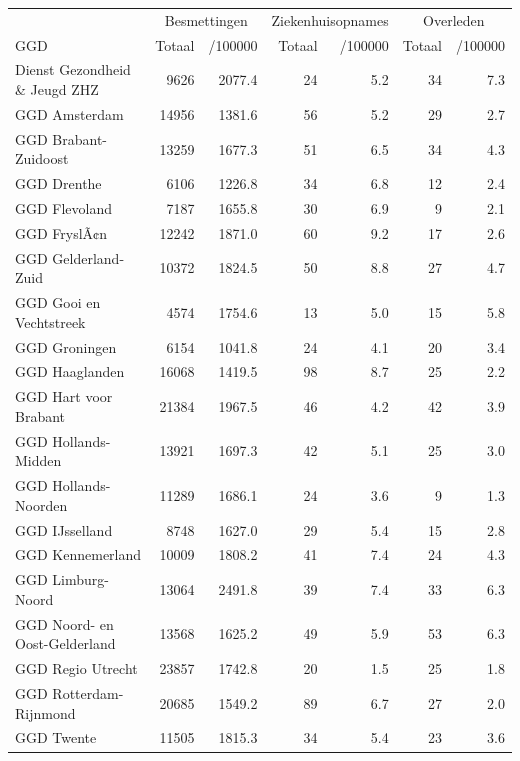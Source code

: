 \documentclass[
  english,
  man,floatsintext]{apa6}
\begin{document}
\begin{table}
\centering\begingroup\fontsize{10}{12}\selectfont

\begin{threeparttable}
\begin{tabular}{lrrrrrr}
\toprule
\multicolumn{1}{c}{ } & \multicolumn{2}{c}{Besmettingen} & \multicolumn{2}{c}{Ziekenhuisopnames} & \multicolumn{2}{c}{Overleden} \\
\cmidrule(l{3pt}r{3pt}){2-3} \cmidrule(l{3pt}r{3pt}){4-5} \cmidrule(l{3pt}r{3pt}){6-7}
GGD & Totaal & /100000 & Totaal & /100000 & Totaal & /100000\\
\midrule
Dienst Gezondheid \& Jeugd ZHZ & 9626 & 2077.4 & 24 & 5.2 & 34 & 7.3\\
GGD Amsterdam & 14956 & 1381.6 & 56 & 5.2 & 29 & 2.7\\
GGD Brabant-Zuidoost & 13259 & 1677.3 & 51 & 6.5 & 34 & 4.3\\
GGD Drenthe & 6106 & 1226.8 & 34 & 6.8 & 12 & 2.4\\
GGD Flevoland & 7187 & 1655.8 & 30 & 6.9 & 9 & 2.1\\
GGD FryslÃ¢n & 12242 & 1871.0 & 60 & 9.2 & 17 & 2.6\\
GGD Gelderland-Zuid & 10372 & 1824.5 & 50 & 8.8 & 27 & 4.7\\
GGD Gooi en Vechtstreek & 4574 & 1754.6 & 13 & 5.0 & 15 & 5.8\\
GGD Groningen & 6154 & 1041.8 & 24 & 4.1 & 20 & 3.4\\
GGD Haaglanden & 16068 & 1419.5 & 98 & 8.7 & 25 & 2.2\\
GGD Hart voor Brabant & 21384 & 1967.5 & 46 & 4.2 & 42 & 3.9\\
GGD Hollands-Midden & 13921 & 1697.3 & 42 & 5.1 & 25 & 3.0\\
GGD Hollands-Noorden & 11289 & 1686.1 & 24 & 3.6 & 9 & 1.3\\
GGD IJsselland & 8748 & 1627.0 & 29 & 5.4 & 15 & 2.8\\
GGD Kennemerland & 10009 & 1808.2 & 41 & 7.4 & 24 & 4.3\\
GGD Limburg-Noord & 13064 & 2491.8 & 39 & 7.4 & 33 & 6.3\\
GGD Noord- en Oost-Gelderland & 13568 & 1625.2 & 49 & 5.9 & 53 & 6.3\\
GGD Regio Utrecht & 23857 & 1742.8 & 20 & 1.5 & 25 & 1.8\\
GGD Rotterdam-Rijnmond & 20685 & 1549.2 & 89 & 6.7 & 27 & 2.0\\
GGD Twente & 11505 & 1815.3 & 34 & 5.4 & 23 & 3.6\\

\end{tabular}
\end{threeparttable}
\end{table}
\end{document}
